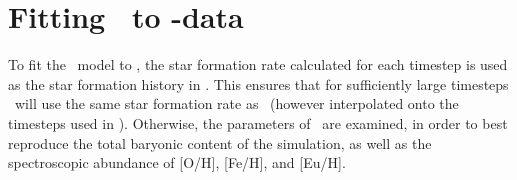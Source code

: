 \section{Fitting \omegamodel\ to \eris-data}
\setlength{}
\newcommand\mwomega{TEMP-MWOmega}
\newcommand\mwcomega{TEMP-MWcteOmega}
\newcommand\fiduccialomega{TEMP-fiduccial}

To fit the \omegamodel\ model to \eris, the star formation rate calculated for each timestep is used as the star formation history in \omegamodel.
This ensures that for sufficiently large timesteps \omegamodel\ will use the same star formation rate as \eris\ (however interpolated onto the timesteps used in \omegamodel).
Otherwise, the parameters of \omegamodel\ are examined, in order to best reproduce the total baryonic content of the simulation, as well as the spectroscopic abundance of [O/H], [Fe/H], and [Eu/H].

